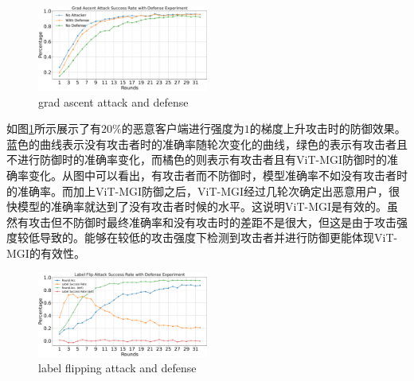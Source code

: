 \documentclass[conference]{IEEEtran}
\def\figGradAscentAttackDefense{0.5\textwidth}
\def\figLabelFlipDefense{0.5\textwidth}
\begin{document}
\begin{figure}[htbp]
    \centerline{\includegraphics[width=\figGradAscentAttackDefense]{pics/004-gradAttack-attackRate=1-withDefense.pdf}}
    \caption{grad ascent attack and defense}
    \label{fig:gradAscentDefense}
\end{figure}

如图\hyperref[fig:gradAscentDefense]{\ref{fig:gradAscentDefense}}所示展示了有$20\%$的恶意客户端进行强度为$1$的梯度上升攻击时的防御效果。蓝色的曲线表示没有攻击者时的准确率随轮次变化的曲线，绿色的表示有攻击者且不进行防御时的准确率变化，而橘色的则表示有攻击者且有ViT-MGI防御时的准确率变化。从图中可以看出，有攻击者而不防御时，模型准确率不如没有攻击者时的准确率。而加上ViT-MGI防御之后，ViT-MGI经过几轮次确定出恶意用户，很快模型的准确率就达到了没有攻击者时候的水平。这说明ViT-MGI是有效的。虽然有攻击但不防御时最终准确率和没有攻击时的差距不是很大，但这是由于攻击强度较低导致的。能够在较低的攻击强度下检测到攻击者并进行防御更能体现ViT-MGI的有效性。

\begin{figure}[htbp]
    \centerline{\includegraphics[width=\figLabelFlipDefense]{pics/005-LabelFlippingAttack-withDefense.pdf}}
    \caption{label flipping attack and defense}
    \label{fig:labelFlipDefense}
\end{figure}
\end{document}
